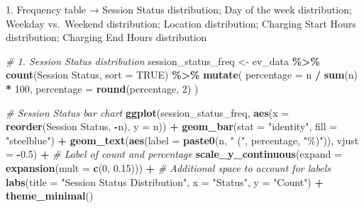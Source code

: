 \documentclass[
  12pt,
]{article}
\newenvironment{Shaded}{\begin{snugshade}}{\end{snugshade}}
\newcommand{\AttributeTok}[1]{\textcolor[rgb]{0.13,0.29,0.53}{#1}}
\newcommand{\CommentTok}[1]{\textcolor[rgb]{0.56,0.35,0.01}{\textit{#1}}}
\newcommand{\ConstantTok}[1]{\textcolor[rgb]{0.56,0.35,0.01}{#1}}
\newcommand{\DecValTok}[1]{\textcolor[rgb]{0.00,0.00,0.81}{#1}}
\newcommand{\FloatTok}[1]{\textcolor[rgb]{0.00,0.00,0.81}{#1}}
\newcommand{\FunctionTok}[1]{\textcolor[rgb]{0.13,0.29,0.53}{\textbf{#1}}}
\newcommand{\NormalTok}[1]{#1}
\newcommand{\OtherTok}[1]{\textcolor[rgb]{0.56,0.35,0.01}{#1}}
\newcommand{\SpecialCharTok}[1]{\textcolor[rgb]{0.81,0.36,0.00}{\textbf{#1}}}
\newcommand{\StringTok}[1]{\textcolor[rgb]{0.31,0.60,0.02}{#1}}
\begin{document}
1.⁠ ⁠Frequency table → Session Status distribution; Day of the week
distribution; Weekday vs.~Weekend distribution; Location distribution;
Charging Start Hours distribution; Charging End Hours distribution

\begin{Shaded}
\begin{Highlighting}[]
\CommentTok{\# 1. Session Status distribution}
\NormalTok{session\_status\_freq }\OtherTok{\textless{}{-}}\NormalTok{ ev\_data }\SpecialCharTok{\%\textgreater{}\%}
  \FunctionTok{count}\NormalTok{(}\StringTok{\textasciigrave{}}\AttributeTok{Session Status}\StringTok{\textasciigrave{}}\NormalTok{, }\AttributeTok{sort =} \ConstantTok{TRUE}\NormalTok{) }\SpecialCharTok{\%\textgreater{}\%}
  \FunctionTok{mutate}\NormalTok{(}
    \AttributeTok{percentage =}\NormalTok{ n }\SpecialCharTok{/} \FunctionTok{sum}\NormalTok{(n) }\SpecialCharTok{*} \DecValTok{100}\NormalTok{,}
    \AttributeTok{percentage =} \FunctionTok{round}\NormalTok{(percentage, }\DecValTok{2}\NormalTok{)}
\NormalTok{  )}

\CommentTok{\# Session Status bar chart}
\FunctionTok{ggplot}\NormalTok{(session\_status\_freq, }\FunctionTok{aes}\NormalTok{(}\AttributeTok{x =} \FunctionTok{reorder}\NormalTok{(}\StringTok{\textasciigrave{}}\AttributeTok{Session Status}\StringTok{\textasciigrave{}}\NormalTok{, }\SpecialCharTok{{-}}\NormalTok{n), }\AttributeTok{y =}\NormalTok{ n)) }\SpecialCharTok{+}
  \FunctionTok{geom\_bar}\NormalTok{(}\AttributeTok{stat =} \StringTok{"identity"}\NormalTok{, }\AttributeTok{fill =} \StringTok{"steelblue"}\NormalTok{) }\SpecialCharTok{+}
  \FunctionTok{geom\_text}\NormalTok{(}\FunctionTok{aes}\NormalTok{(}\AttributeTok{label =} \FunctionTok{paste0}\NormalTok{(n, }\StringTok{" ("}\NormalTok{, percentage, }\StringTok{"\%)"}\NormalTok{)), }\AttributeTok{vjust =} \SpecialCharTok{{-}}\FloatTok{0.5}\NormalTok{) }\SpecialCharTok{+} \CommentTok{\# Label of count and percentage}
  \FunctionTok{scale\_y\_continuous}\NormalTok{(}\AttributeTok{expand =} \FunctionTok{expansion}\NormalTok{(}\AttributeTok{mult =} \FunctionTok{c}\NormalTok{(}\DecValTok{0}\NormalTok{, }\FloatTok{0.15}\NormalTok{))) }\SpecialCharTok{+} \CommentTok{\# Additional space to account for labels}
  \FunctionTok{labs}\NormalTok{(}\AttributeTok{title =} \StringTok{"Session Status Distribution"}\NormalTok{, }\AttributeTok{x =} \StringTok{"Status"}\NormalTok{, }\AttributeTok{y =} \StringTok{"Count"}\NormalTok{) }\SpecialCharTok{+}
  \FunctionTok{theme\_minimal}\NormalTok{()}
\end{Highlighting}
\end{Shaded}
\end{document}

